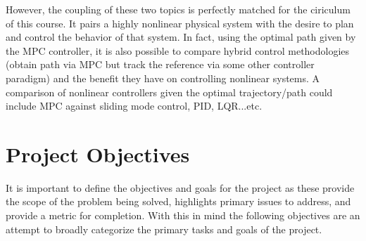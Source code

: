 \documentclass[12px]{article}
\begin{document}
    \noindent However, the coupling of these two topics is perfectly matched for the ciriculum of this course. It pairs a highly nonlinear physical system with the desire to plan and control the behavior of that system. In fact, using the optimal path given by the MPC controller, it is also possible to compare hybrid control methodologies (obtain path via MPC but track the reference via some other controller paradigm) and the benefit they have on controlling nonlinear systems. A comparison of nonlinear controllers given the optimal trajectory/path could include MPC against sliding mode control, PID, LQR...etc.


    \pagebreak


    \section*{Project Objectives}

    It is important to define the objectives and goals for the project as these provide the scope of the problem being solved, highlights primary issues to address, and provide a metric for completion. With this in mind the following objectives are an attempt to broadly categorize the primary tasks and goals of the project.
\end{document}
